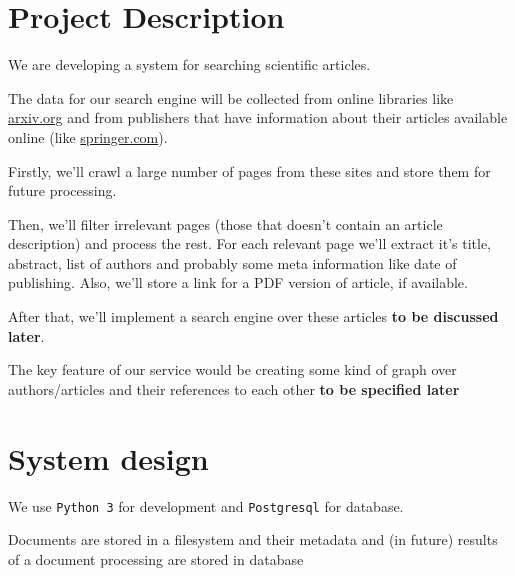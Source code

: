 \section{Project Description}

We are developing a system for searching scientific articles.

The data for our search engine will be collected from online libraries like \url{arxiv.org} 
and from publishers that have information about their articles available online (like \url{springer.com}).

Firstly, we'll crawl a large number of pages from these sites and store them for future processing.

Then, we'll filter irrelevant pages (those that doesn't contain an article description) and process the rest.
For each relevant page we'll extract it's title, abstract, list of authors and probably some meta information like date of publishing.
Also, we'll store a link for a PDF version of article, if available.

After that, we'll implement a search engine over these articles \textbf{to be discussed later}.

The key feature of our service would be creating some kind of graph over authors/articles and their references to each other \textbf{to be specified later} 

\section{System design}
We use \texttt{Python 3} for development and \texttt{Postgresql} for database.

Documents are stored in a filesystem and their metadata and (in future) results of a document processing are stored in database



